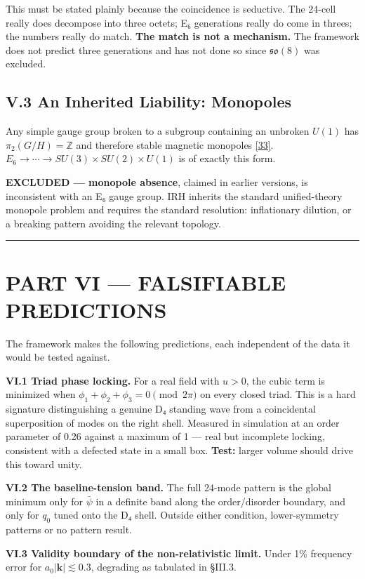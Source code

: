 \documentclass[a4paper,11pt]{article}
\begin{document}
This must be stated plainly because the coincidence is seductive. The 24-cell really does decompose into three octets; E₆ generations really do come in threes; the numbers really do match. \textbf{The match is not a mechanism.} The framework does not predict three generations and has not done so since $\mathfrak{so}(8)$ was excluded.

\subsection*{V.3 An Inherited Liability: Monopoles}

Any simple gauge group broken to a subgroup containing an unbroken $U(1)$ has $\pi_2(G/H)=\mathbb{Z}$ and therefore stable magnetic monopoles \hyperref[ref33]{[33]}. $E_6\to\cdots\to SU(3)\times SU(2)\times U(1)$ is of exactly this form.

\textbf{EXCLUDED — monopole absence}, claimed in earlier versions, is inconsistent with an E₆ gauge group. IRH inherits the standard unified-theory monopole problem and requires the standard resolution: inflationary dilution, or a breaking pattern avoiding the relevant topology.

\medskip\hrule\medskip

\section*{PART VI — FALSIFIABLE PREDICTIONS}

The framework makes the following predictions, each independent of the data it would be tested against.

\textbf{VI.1 Triad phase locking.} For a real field with $u>0$, the cubic term is minimized when $\phi_1+\phi_2+\phi_3=0\pmod{2\pi}$ on every closed triad. This is a hard signature distinguishing a genuine D₄ standing wave from a coincidental superposition of modes on the right shell. Measured in simulation at an order parameter of 0.26 against a maximum of 1 — real but incomplete locking, consistent with a defected state in a small box. \textbf{Test:} larger volume should drive this toward unity.

\textbf{VI.2 The baseline-tension band.} The full 24-mode pattern is the global minimum only for $\bar\psi$ in a definite band along the order/disorder boundary, and only for $q_0$ tuned onto the D₄ shell. Outside either condition, lower-symmetry patterns or no pattern result.

\textbf{VI.3 Validity boundary of the non-relativistic limit.} Under 1\% frequency error for $a_0|\mathbf k|\lesssim0.3$, degrading as tabulated in §III.3.
\end{document}
